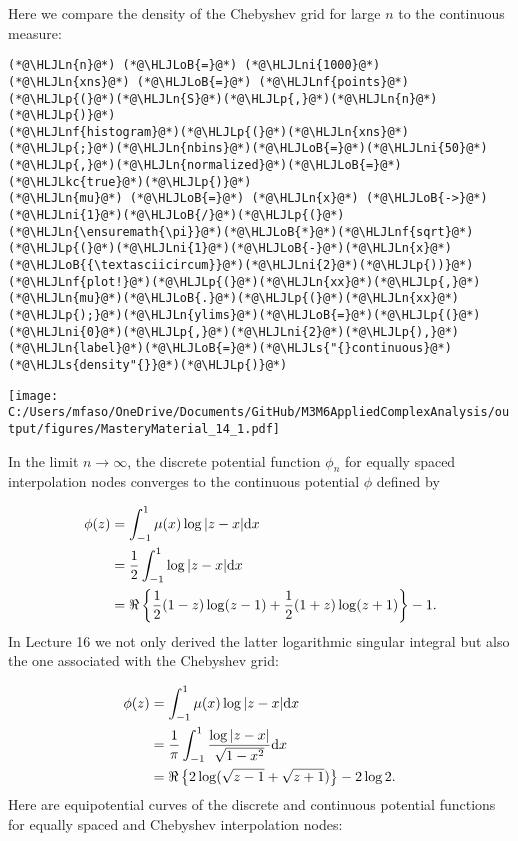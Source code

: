 \documentclass[12pt,a4paper]{article}
\newcommand{\HLJLkc}[1]{\textcolor[RGB]{59,151,46}{\textit{#1}}}
\newcommand{\HLJLn}[1]{#1}
\newcommand{\HLJLnf}[1]{\textcolor[RGB]{66,102,213}{#1}}
\newcommand{\HLJLs}[1]{\textcolor[RGB]{201,61,57}{#1}}
\newcommand{\HLJLni}[1]{\textcolor[RGB]{59,151,46}{#1}}
\newcommand{\HLJLoB}[1]{\textcolor[RGB]{102,102,102}{\textbf{#1}}}
\newcommand{\HLJLp}[1]{#1}
\def\D{ {\rm d} }
\def\dx{\D x}
\begin{document}
Here we compare the density of the Chebyshev grid for large $n$ to the continuous measure:


\begin{lstlisting}
(*@\HLJLn{n}@*) (*@\HLJLoB{=}@*) (*@\HLJLni{1000}@*)
(*@\HLJLn{xns}@*) (*@\HLJLoB{=}@*) (*@\HLJLnf{points}@*)(*@\HLJLp{(}@*)(*@\HLJLn{S}@*)(*@\HLJLp{,}@*)(*@\HLJLn{n}@*)(*@\HLJLp{)}@*)
(*@\HLJLnf{histogram}@*)(*@\HLJLp{(}@*)(*@\HLJLn{xns}@*)(*@\HLJLp{;}@*)(*@\HLJLn{nbins}@*)(*@\HLJLoB{=}@*)(*@\HLJLni{50}@*)(*@\HLJLp{,}@*)(*@\HLJLn{normalized}@*)(*@\HLJLoB{=}@*)(*@\HLJLkc{true}@*)(*@\HLJLp{)}@*)
(*@\HLJLn{mu}@*) (*@\HLJLoB{=}@*) (*@\HLJLn{x}@*) (*@\HLJLoB{->}@*) (*@\HLJLni{1}@*)(*@\HLJLoB{/}@*)(*@\HLJLp{(}@*)(*@\HLJLn{\ensuremath{\pi}}@*)(*@\HLJLoB{*}@*)(*@\HLJLnf{sqrt}@*)(*@\HLJLp{(}@*)(*@\HLJLni{1}@*)(*@\HLJLoB{-}@*)(*@\HLJLn{x}@*)(*@\HLJLoB{{\textasciicircum}}@*)(*@\HLJLni{2}@*)(*@\HLJLp{))}@*)
(*@\HLJLnf{plot!}@*)(*@\HLJLp{(}@*)(*@\HLJLn{xx}@*)(*@\HLJLp{,}@*)(*@\HLJLn{mu}@*)(*@\HLJLoB{.}@*)(*@\HLJLp{(}@*)(*@\HLJLn{xx}@*)(*@\HLJLp{);}@*)(*@\HLJLn{ylims}@*)(*@\HLJLoB{=}@*)(*@\HLJLp{(}@*)(*@\HLJLni{0}@*)(*@\HLJLp{,}@*)(*@\HLJLni{2}@*)(*@\HLJLp{),}@*)(*@\HLJLn{label}@*)(*@\HLJLoB{=}@*)(*@\HLJLs{"{}continuous}@*) (*@\HLJLs{density"{}}@*)(*@\HLJLp{)}@*)
\end{lstlisting}

\texttt{[image: C:/Users/mfaso/OneDrive/Documents/GitHub/M3M6AppliedComplexAnalysis/output/figures/MasteryMaterial\_14\_1.pdf]}

In the limit $n \to \infty$, the discrete potential function $\phi_n$ for equally spaced interpolation nodes converges to the continuous potential $\phi$ defined by


\begin{align*}
\phi(z) &=  \int_{-1}^{1} \mu(x) \log \vert z - x \vert \dx \\
        &=   {1 \over 2}\int_{-1}^{1}  \log \vert z - x \vert \dx \\
        &=   \Re \left\lbrace {1\over 2}(1-z) \log(z-1) + {1\over 2}(1+z) \log(z+1) \right\rbrace  -1.
\end{align*}
In Lecture 16 we not only derived the latter logarithmic singular integral but also the one associated with the Chebyshev grid:


\begin{align*}
\phi(z) &=  \int_{-1}^{1} \mu(x) \log \vert z - x \vert \dx \\
        &=   {1 \over \pi}\int_{-1}^{1}  {\log \vert z - x \vert\over \sqrt{1-x^2}} \dx \\
        &=   \Re \left\lbrace 2\log(\sqrt{z-1} + \sqrt{z+1})  \right\rbrace  -2 \log 2.
\end{align*}
Here are equipotential curves of the discrete and continuous potential functions for equally spaced and Chebyshev interpolation nodes:
\end{document}
